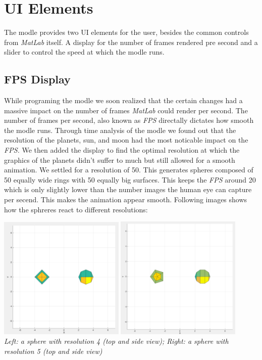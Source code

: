 \chapter{UI Elements}

The modle provides two UI elements for the user, besides the common controls from {\em MatLab} itself. A display for the number of frames rendered pre second and a slider to control the speed at which the modle runs.

\section{FPS Display}
While programing the modle we soon realized that the certain changes had a massive impact on the number of frames {\em MatLab} could render per second. The number of frames per second, also known as {\em FPS} directally dictates how smooth the modle runs. Through time analysis of the modle we found out that the resolution of the planets, sun, and moon had the most noticable impact on the {\em FPS.} We then added the display to find the optimal resolution at which the graphics of the planets didn't suffer to much but still allowed for a smooth animation. We settled for a resolution of 50. This generates spheres composed of 50 equally wide rings with 50 equally big surfaces. This keeps the {\em FPS} around 20 which is only slightly lower than the number images the human eye can capture per secend. This makes the animation appear smooth. Following images shows how the sphreres react to different resolutions:

\begin{center}
\includegraphics[width=0.45\textwidth]{imgs/ui_elements/spheres_res4.jpg}
\includegraphics[width=0.45\textwidth]{imgs/ui_elements/spheres_res5.jpg}\\
\textit{Left: a sphere with resolution 4 (top and side view); Right: a sphere with resolution 5 (top and side view)}
\end{center}

